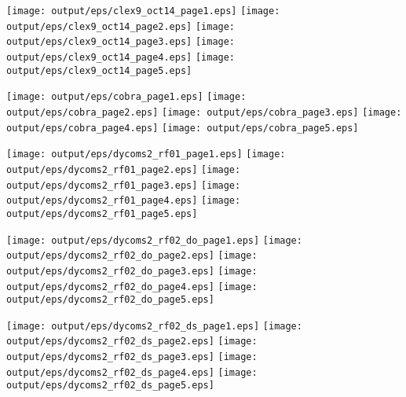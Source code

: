 \documentclass[11pt]{article}
\begin{document}
\begin{center}

\texttt{[image: output/eps/clex9\_oct14\_page1.eps]}
\texttt{[image: output/eps/clex9\_oct14\_page2.eps]}
\texttt{[image: output/eps/clex9\_oct14\_page3.eps]}
\texttt{[image: output/eps/clex9\_oct14\_page4.eps]}
\texttt{[image: output/eps/clex9\_oct14\_page5.eps]}
\end{center}
\newpage

\begin{center}

\texttt{[image: output/eps/cobra\_page1.eps]}
\texttt{[image: output/eps/cobra\_page2.eps]}
\texttt{[image: output/eps/cobra\_page3.eps]}
\texttt{[image: output/eps/cobra\_page4.eps]}
\texttt{[image: output/eps/cobra\_page5.eps]}
\end{center}
\newpage

\begin{center}

\texttt{[image: output/eps/dycoms2\_rf01\_page1.eps]}
\texttt{[image: output/eps/dycoms2\_rf01\_page2.eps]}
\texttt{[image: output/eps/dycoms2\_rf01\_page3.eps]}
\texttt{[image: output/eps/dycoms2\_rf01\_page4.eps]}
\texttt{[image: output/eps/dycoms2\_rf01\_page5.eps]}
\end{center}
\newpage

\begin{center}

\texttt{[image: output/eps/dycoms2\_rf02\_do\_page1.eps]}
\texttt{[image: output/eps/dycoms2\_rf02\_do\_page2.eps]}
\texttt{[image: output/eps/dycoms2\_rf02\_do\_page3.eps]}
\texttt{[image: output/eps/dycoms2\_rf02\_do\_page4.eps]}
\texttt{[image: output/eps/dycoms2\_rf02\_do\_page5.eps]}
\end{center}
\newpage

\begin{center}

\texttt{[image: output/eps/dycoms2\_rf02\_ds\_page1.eps]}
\texttt{[image: output/eps/dycoms2\_rf02\_ds\_page2.eps]}
\texttt{[image: output/eps/dycoms2\_rf02\_ds\_page3.eps]}
\texttt{[image: output/eps/dycoms2\_rf02\_ds\_page4.eps]}
\texttt{[image: output/eps/dycoms2\_rf02\_ds\_page5.eps]}
\end{center}
\newpage
\end{document}
